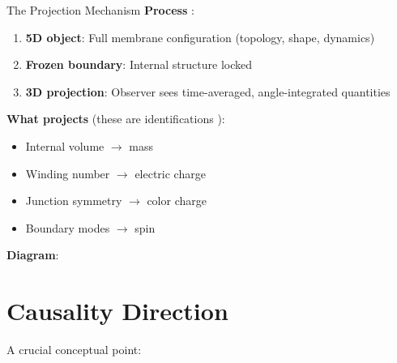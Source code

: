 \begin{mechanism}{The Projection Mechanism}
\textbf{Process} \tagP{}:
\begin{enumerate}[nosep]
\item \textbf{5D object}: Full membrane configuration (topology, shape, dynamics)
\item \textbf{Frozen boundary}: Internal structure locked
\item \textbf{3D projection}: Observer sees time-averaged, angle-integrated quantities
\end{enumerate}

\textbf{What projects} (these are identifications \tagI{}):
\begin{itemize}[nosep]
\item Internal volume $\to$ mass
\item Winding number $\to$ electric charge
\item Junction symmetry $\to$ color charge
\item Boundary modes $\to$ spin
\end{itemize}

\textbf{Diagram}:
\begin{center}
\end{center}
\end{mechanism}

\section{Causality Direction}
\label{sec:causality}

A crucial conceptual point:

